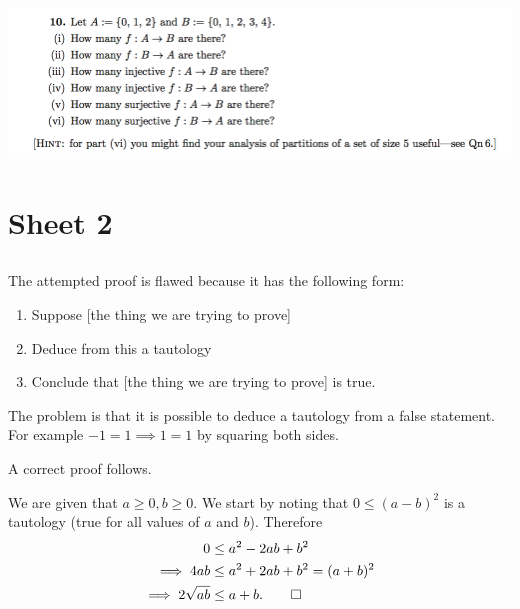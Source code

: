 \documentclass[12pt]{article}
\begin{document}
\newpage
\subsection*{} %
\includegraphics[width=400pt]{img/iulm-1-10.png}
\begin{mdframed}
\end{mdframed}

\newpage
\section{Sheet 2}
\subsection{}
\begin{mdframed}
  The attempted proof is flawed because it has the following form:
  \begin{enumerate}
  \item Suppose [the thing we are trying to prove]
  \item Deduce from this a tautology
  \item Conclude that [the thing we are trying to prove] is true.
  \end{enumerate}
  The problem is that it is possible to deduce a tautology from a false
  statement. For example $-1 = 1 \implies 1 = 1$ by squaring both sides.

  A correct proof follows.

  We are given that $a \geq 0, b \geq 0$. We start by noting that
  $0 \leq (a - b)^2$ is a tautology (true for all values of $a$ and
  $b$). Therefore
  \begin{align*}
              0 &\leq a^2 -2ab + b^2\\
    \implies  4ab &\leq a^2 + 2ab + b^2 = (a + b)^2\\
    \implies  2\sqrt{ab} &\leq a+b. \qed
  \end{align*}
\end{mdframed}
\end{document}
